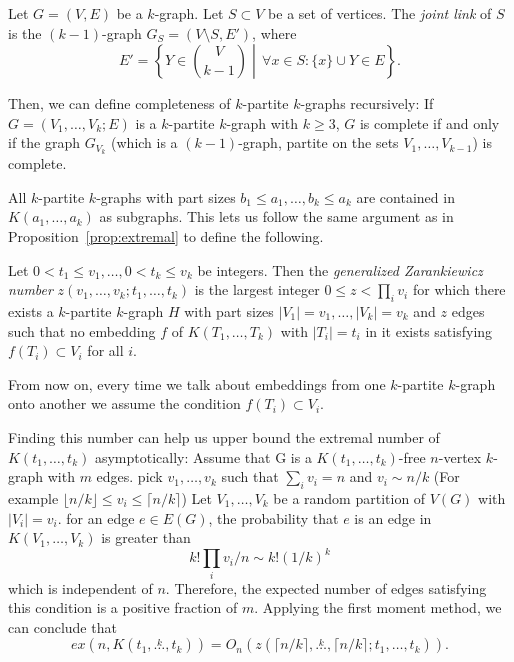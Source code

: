 \begin{definition}
    Let $G = (V, E)$ be a $k$-graph.
    Let $S \subset V$ be a set of vertices.
    The \emph{joint link} of $S$ is the $(k-1)$-graph $G_S = (V \setminus S, E')$, where
    \[
        E' = \left\{Y \in \binom{V}{k-1}\middle\vert \, \forall x \in S : \{x\} \cup Y \in E \right\}.
    \]
\end{definition}

Then, we can define completeness of $k$-partite $k$-graphs recursively: If $G = (V_1, \dots, V_k; E)$
is a $k$-partite $k$-graph with $k \geq 3$,
$G$ is complete if and only if the graph $G_{V_k}$ (which is a $(k-1)$-graph, partite on the sets
$V_1, \dots, V_{k-1}$) is complete.



\begin{remark}
    All $k$-partite $k$-graphs with part sizes $b_1 \leq a_1, \dots, b_k \leq a_k$
    are contained in $K(a_1, \dots, a_k)$ as subgraphs.
    This lets us follow the same argument as in Proposition~\ref{prop:extremal}
    to define the following.
\end{remark}

\begin{definition}\label{def:zarankiewicz}
    Let $0 < t_1 \leq v_1, \dots, 0 < t_k \leq v_k$ be integers.
    Then the \emph{generalized Zarankiewicz number} $z(v_1, \dots, v_k; t_1, \dots, t_k)$
    is the largest integer $0 \leq z < \prod_i{ v_i}$ for which there exists a $k$-partite $k$-graph
    $H$ with part sizes $ |V_1| = v_1, \dots, |V_k| = v_k$ and $z$ edges
    such that no embedding $f$ of $K(T_1, \dots, T_k)$ with $|T_i| = t_i$ in it exists
    satisfying $f(T_i) \subset V_i$ for all $i$.
\end{definition}

From now on, every time we talk about embeddings from one $k$-partite $k$-graph
onto another we assume the condition $f(T_i) \subset V_i$.

\begin{remark}\label{rem:zar_vs_turan}
    Finding this number can help us upper bound the extremal number of $K(t_1, \dots, t_k)$ asymptotically:
    Assume that G is a $K(t_1, \dots, t_k)$-free $n$-vertex $k$-graph with $m$ edges.
    pick $v_1, \dots, v_k$ such that $\sum_{i} v_i = n $ and $v_i \sim n/k $
    (For example $\lfloor n/k \rfloor \leq v_i \leq \lceil n/k \rceil$)
    Let $V_1, \dots, V_k$ be a random partition of $V(G)$ with $|V_i| = v_i$.
    for an edge $e \in E(G)$, the probability that $e$ is an edge in $K(V_1, \dots, V_k)$ is
    greater than
    \[k! \prod_i v_i / n \sim k! (1/k)^k\]
    which is independent of $n$.
    Therefore, the expected number of edges satisfying this condition is a positive fraction of $m$.
    Applying the first moment method, we can conclude that
    \[ex(n, K(t_1, \overset{k}{\dots}, t_k)) = O_n(z(\lceil n / k \rceil , \overset{k}{\dots}, \lceil n / k \rceil; t_1, \dots, t_k)).\]

\end{remark}


